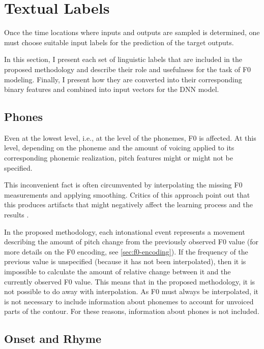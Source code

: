 \section{Textual Labels}
\label{sec:linguistic-labels}

Once the time locations where inputs and outputs are sampled is determined, one must choose suitable input labels for the prediction of the target outputs. 

In this section, I present each set of linguistic labels that are included in the proposed methodology and describe their role and usefulness for the task of \ac{F0} modeling.
Finally, I present how they are converted into their corresponding binary features and combined into input vectors for the \ac{DNN} model.

\subsection{Phones}

Even at the lowest level, i.e., at the level of the phonemes, \ac{F0} is affected. 
At this level, depending on the phoneme and the amount of voicing applied to its corresponding phonemic realization, pitch features might or might not be specified. 

This inconvenient fact is often circumvented by interpolating the missing \ac{F0} measurements and applying smoothing. 
Critics of this approach point out that this produces artifacts that might negatively affect the learning process and the results \citep{Wang2017RNN}.

In the proposed methodology, each intonational event represents a movement describing the amount of pitch change from the previously observed \ac{F0} value (for more details on the \ac{F0} encoding, see \autoref{sec:f0-encoding}).
If the frequency of the previous value is unspecified (because it has not been interpolated), then it is impossible to calculate the amount of relative change between it and the currently observed \ac{F0} value.
This means that in the proposed methodology, it is not possible to do away with interpolation.
As \ac{F0} must always be interpolated, it is not necessary to include information about phonemes to account for unvoiced parts of the contour.
For these reasons, information about phones is not included.


\subsection{Onset and Rhyme}

